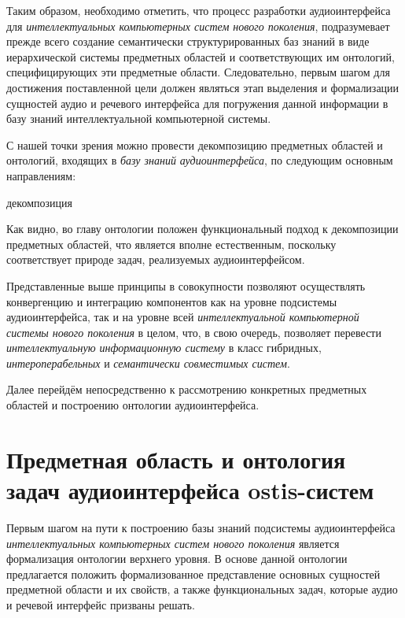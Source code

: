 Таким образом, необходимо отметить, что процесс разработки аудиоинтерфейса для \textit{интеллектуальных компьютерных систем нового поколения}, подразумевает прежде всего создание семантически структурированных баз знаний в виде иерархической системы предметных областей и соответствующих им онтологий, специфицирующих эти предметные области. Следовательно, первым шагом для достижения поставленной цели должен являться этап выделения и формализации сущностей аудио и речевого интерфейса для погружения данной информации в базу знаний интеллектуальной компьютерной системы.

С нашей точки зрения можно провести декомпозицию предметных областей и онтологий, входящих в \textit{базу знаний} \textit{аудиоинтерфейса}, по следующим основным направлениям:

\begin{SCn}
	\begin{scnreltoset}{декомпозиция}
	\end{scnreltoset}
\end{SCn}

Как видно, во главу онтологии положен функциональный подход к декомпозиции предметных областей, что является вполне естественным, поскольку соответствует природе задач, реализуемых аудиоинтерфейсом.

Представленные выше принципы в совокупности позволяют осуществлять конвергенцию и интеграцию компонентов как на уровне подсистемы аудиоинтерфейса, так и на уровне всей \textit{интеллектуальной компьютерной системы нового поколения} в целом, что, в свою очередь, позволяет перевести \textit{интеллектуальную информационную систему} в класс гибридных, \textit{интероперабельных} и \textit{семантически совместимых систем}.
  
 Далее перейдём непосредственно к рассмотрению конкретных предметных областей и построению онтологии аудиоинтерфейса.

\section{Предметная область и онтология задач аудиоинтерфейса ostis-систем}
\label{sec_audio_interfaces_subject_area_problems}

Первым шагом на пути к построению базы знаний подсистемы аудиоинтерфейса \textit{интеллектуальных компьютерных систем нового поколения} является формализация онтологии верхнего уровня. В основе данной онтологии предлагается положить формализованное представление основных сущностей предметной области и их свойств, а также функциональных задач, которые аудио и речевой интерфейс призваны решать. 

